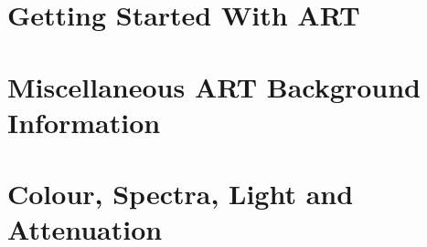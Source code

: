 \documentclass{art}
\newcommand{\Part}[1]{\clearemptydoublepage\part{#1}}
\begin{document}

\thispagestyle{empty}

\clearemptydoublepage
\thispagestyle{empty}

\clearemptydoublepage
\tableofcontents

\setcounter{page}{-1}
\Part{Getting Started With ART}




%

\Part{Miscellaneous ART Background Information}


\Part{Colour, Spectra, Light and Attenuation}



\clearemptydoublepage

\end{document}
